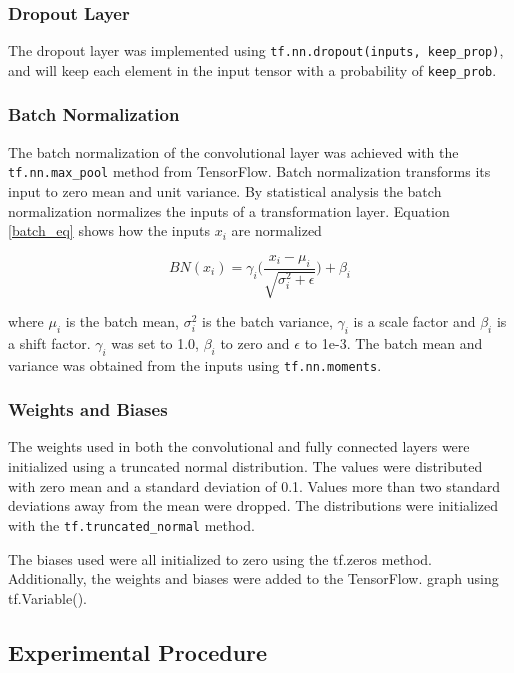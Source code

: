 \documentclass[]{article}
\begin{document}
\subsubsection{Dropout Layer}

The dropout layer was implemented using \texttt{tf.nn.dropout(inputs, keep\_prop)}, and will keep each element in the input tensor with a probability of \texttt{keep\_prob}. 

\subsubsection{Batch Normalization}

The batch normalization of the convolutional layer was achieved with the \texttt{tf.nn.max\_pool} method from TensorFlow. Batch normalization transforms its input to zero mean and unit variance. By statistical analysis the batch normalization normalizes the inputs of a transformation layer. Equation \ref{batch_eq} shows how the inputs \(x_i\) are normalized

\begin{equation} \label{batch_eq}
BN(x_i) = \gamma_i \Big( \frac{x_i - \mu_i}{\sqrt{\sigma_i^2 + \epsilon}} \Big) + \beta_i
\end{equation}

where \(\mu_i\) is the batch mean, \(\sigma_i^2\) is the batch variance, \(\gamma_i\) is a scale factor and \(\beta_i\) is a shift factor. \(\gamma_i\) was set to 1.0, \(\beta_i\) to zero and \(\epsilon\) to 1e-3. The batch mean and variance was obtained from the inputs using \texttt{tf.nn.moments}. 


\subsubsection{Weights and Biases} \label{weights}

The weights used in both the convolutional and fully connected layers were initialized using a truncated normal distribution. The values were distributed with zero mean and a standard deviation of 0.1. Values more than two standard deviations away from the mean were dropped. The distributions were initialized with the \texttt{tf.truncated\_normal} method. 

The biases used were all initialized to zero using the tf.zeros method. Additionally, the weights and biases were added to the TensorFlow. graph using  tf.Variable().

\subsection{Experimental Procedure}
\end{document}
